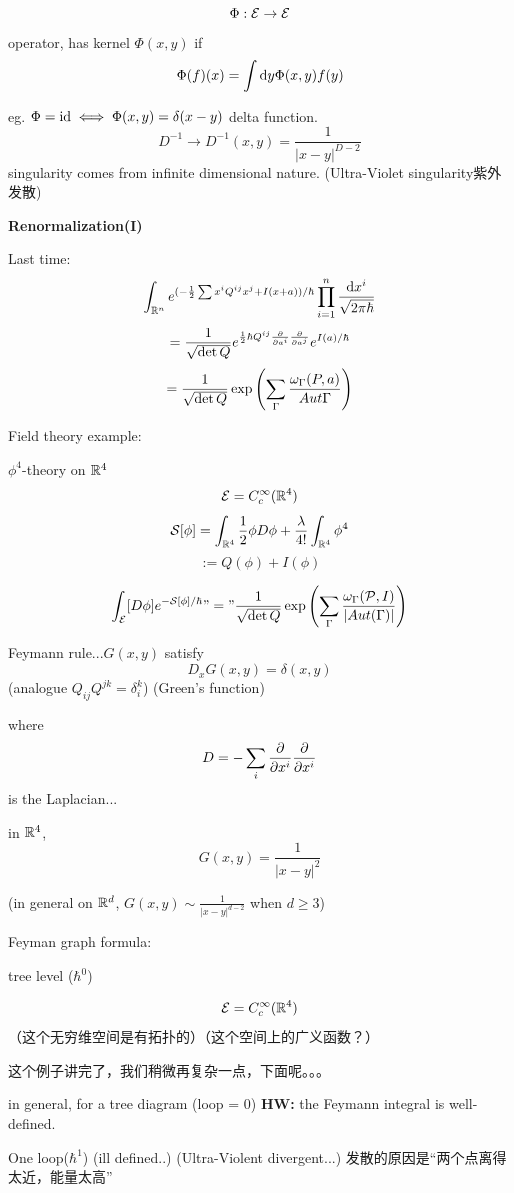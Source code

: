 $$\Phi:\mathcal{E}\to\mathcal{E}$$
operator, has kernel $\Phi(x,y)$ if 
$$\Phi(f)(x)=\int\mathrm{d} y\Phi(x,y)f(y)$$

eg. $\Phi=\operatorname{id}\iff\Phi(x,y)=\delta(x-y)$ delta function.
$$D^{-1}\to D^{-1}(x,y)=\frac{1}{|x-y|^{D-2}}$$
singularity comes from infinite dimensional nature.
(Ultra-Violet singularity紫外发散)



\textbf{Renormalization(I)}

Last time: 
$$\int_{\mathbb{R}^n}e^{(-\frac{1}{2}\sum x^iQ^{ij}x^j+I(x+a))/\hbar}
\prod_{i=1}^n\frac{\mathrm{d} x^i}{\sqrt{2\pi\hbar}}$$
$$=\frac{1}{\sqrt{\det Q}}e^{\frac{1}{2}\hbar Q^{ij}\frac{\partial } {\partial a^i}\frac{\partial } {\partial a^j}}e^{I(a)/\hbar}$$
$$=\frac{1}{\sqrt{\det Q}}\exp
\left(
  \sum_{\Gamma}
   \frac{\omega_\Gamma(P,a)}{Aut\Gamma}
\right)$$


Field theory example:

$\phi^4$-theory on $\mathbb{R}^4$
$$\mathcal{E}=C^{\infty}_c(\mathbb{R}^4)$$
$$\mathcal{S}[\phi]=\int_{\mathbb{R}^4}\frac{1}{2}\phi D\phi+\frac{\lambda}{4!}\int_{\mathbb{R}^4}\phi^4$$
$$:=Q(\phi)+I(\phi)$$

$$\int_{\mathcal{E}}[D\phi]e^{-\mathcal{S}[\phi]/\hbar}
"="\frac{1}{\sqrt{\det Q}}\exp
\left(
  \sum_{\Gamma}
    \frac{\omega_{\Gamma}(\mathcal{P},I)}
         {|Aut(\Gamma)|}
\right)$$

Feymann rule...$G(x,y)$ satisfy 
$$D_xG(x,y)=\delta(x,y)$$
(analogue $Q_{ij}Q^{jk}=\delta^{k}_i$)
(Green's function)

where $$D=-\sum_i\frac{\partial } {\partial x^i}\frac{\partial } {\partial x^i}$$
is the Laplacian...

in $\mathbb{R}^4$,
$$G(x,y)=\frac{1}{|x-y|^2}$$

(in general on $\mathbb{R}^d$, $G(x,y)\sim\frac{1}{|x-y|^{d-2}}$ when $d\geq 3$)

Feyman graph formula:

tree level ($\hbar^0$)

$$\mathcal{E}=C_c^\infty(\mathbb{R}^4)$$
（这个无穷维空间是有拓扑的）（这个空间上的广义函数？）

这个例子讲完了，我们稍微再复杂一点，下面呢。。。

in general, for a tree diagram (loop = 0) 
\textbf{HW:}
the Feymann integral is well-defined.

One loop($\hbar^1$)
(ill defined..)
(Ultra-Violent divergent...)
发散的原因是“两个点离得太近，能量太高”

